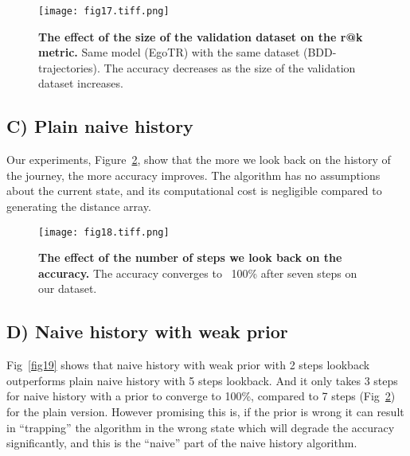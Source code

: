 \documentclass[10pt,letterpaper]{article}
\begin{document}
\begin{table}[!ht]
  \centering
  \caption{
  {\bf r@k metrics of EgoTR fine-tuned over the reshaped BDD-trajectories dataset.}}
  \label{table6}
\end{table}

\begin{figure}[!h]
  \caption{{\bf The effect of the size of the validation dataset on the r@k metric.}  Same model (EgoTR) with the same dataset (BDD-trajectories). The accuracy decreases as the size of the validation dataset increases.}
  \texttt{[image: fig17.tiff.png]}
  \label{fig17}
\end{figure}
\FloatBarrier

\subsection*{C) Plain naive history}
Our experiments, Figure~\ref{fig18}, show that the more we look back on the history of the journey, the more accuracy improves. The algorithm has no assumptions about the current state, and its computational cost is negligible compared to generating the distance array.


\begin{figure}[!h]
  \caption{{\bf The effect of the number of steps we look back on the accuracy.} The accuracy converges to ~100\% after seven steps on our dataset.}
  \texttt{[image: fig18.tiff.png]}
  \label{fig18}
\end{figure}

\FloatBarrier

\subsection*{D) Naive history with weak prior}
Fig~\ref{fig19} shows that naive history with weak prior with 2 steps lookback outperforms plain naive history with 5 steps lookback. And it only takes 3 steps for naive history with a prior to converge to 100\%, compared to 7 steps (Fig~\ref{fig18}) for the plain version. 
However promising this is, if the prior is wrong it can result in “trapping” the algorithm in the wrong state which will degrade the accuracy significantly, and this is the “naive” part of the naive history algorithm.
\end{document}
